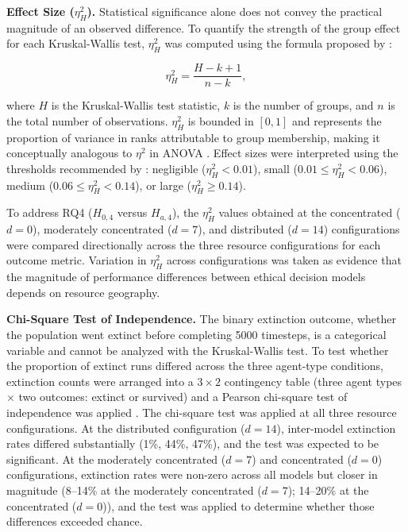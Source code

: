 \documentclass{icsthesis}
\begin{document}
\begin{mainmatter}
			\textbf{Effect Size (\(\eta^2_H\)).}
			Statistical significance alone does not convey the practical magnitude of an observed difference. To quantify the strength of the group effect for each Kruskal-Wallis test, $\eta^2_H$ was computed using the formula proposed by \citet{Tomczak2014}:

			\begin{equation}
				\eta^2_H = \frac{H - k + 1}{n - k},
			\end{equation}

			\noindent where $H$ is the Kruskal-Wallis test statistic, $k$ is the number of groups, and $n$ is the total number of observations. $\eta^2_H$ is bounded in $[0, 1]$ and represents the proportion of variance in ranks attributable to group membership, making it conceptually analogous to $\eta^2$ in ANOVA \citep{Cohen1988}. Effect sizes were interpreted using the thresholds recommended by \citet{Tomczak2014}: negligible ($\eta^2_H < 0.01$), small ($0.01 \leq \eta^2_H < 0.06$), medium ($0.06 \leq \eta^2_H < 0.14$), or large ($\eta^2_H \geq 0.14$).

			To address RQ4 ($H_{0,4}$ versus $H_{a,4}$), the $\eta^2_H$ values obtained at the concentrated ($d = 0$), moderately concentrated ($d = 7$), and distributed ($d = 14$) configurations were compared directionally across the three resource configurations for each outcome metric. Variation in $\eta^2_H$ across configurations was taken as evidence that the magnitude of performance differences between ethical decision models depends on resource geography.

			\textbf{Chi-Square Test of Independence.}
			The binary extinction outcome, whether the population went extinct before completing 5000 timesteps, is a categorical variable and cannot be analyzed with the Kruskal-Wallis test. To test whether the proportion of extinct runs differed across the three agent-type conditions, extinction counts were arranged into a $3 \times 2$ contingency table (three agent types $\times$ two outcomes: extinct or survived) and a Pearson chi-square test of independence was applied \citep{Pearson1900}. The chi-square test was applied at all three resource configurations. At the distributed configuration ($d = 14$), inter-model extinction rates differed substantially (1\%, 44\%, 47\%), and the test was expected to be significant. At the moderately concentrated ($d = 7$) and concentrated ($d = 0$) configurations, extinction rates were non-zero across all models but closer in magnitude (8--14\% at the moderately concentrated ($d = 7$); 14--20\% at the concentrated ($d = 0$)), and the test was applied to determine whether those differences exceeded chance.


\end{mainmatter}
\end{document}
